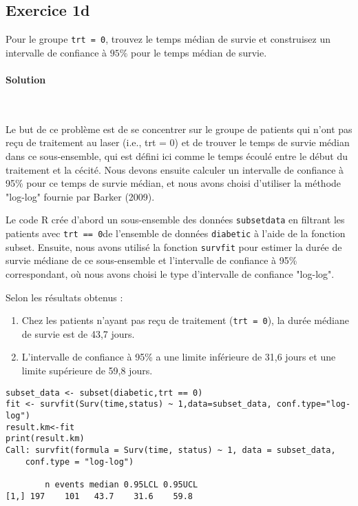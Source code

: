 \documentclass[../main.tex]{subfiles}
\begin{document}
\begin{CJK*}{UTF8}{gbsn}

\section*{Exercice 1d}
Pour le groupe \texttt{trt = 0}, trouvez le temps médian de survie et
construisez un intervalle de confiance à $95\%$ pour le temps médian de survie.
    
\paragraph{Solution}\
    
Le but de ce problème est de se concentrer sur le groupe de patients qui n'ont pas reçu de traitement au laser (i.e., trt = 0) et de trouver le temps de survie médian dans ce sous-ensemble, qui est défini ici comme le temps écoulé entre le début du traitement et la cécité. Nous devons ensuite calculer un intervalle de confiance à 95\% pour ce temps de survie médian, et nous avons choisi d'utiliser la méthode "log-log" fournie par Barker (2009).
    
Le code R crée d'abord un sous-ensemble des données \texttt{subsetdata} en filtrant les patients avec \texttt{trt == 0}de l'ensemble de données \texttt{diabetic} à l'aide de la fonction subset. Ensuite, nous avons utilisé la fonction \texttt{survfit} pour estimer la durée de survie médiane de ce sous-ensemble et l'intervalle de confiance à 95\% correspondant, où nous avons choisi le type d'intervalle de confiance "log-log".
    
Selon les résultats obtenus :
\begin{enumerate}
    \item Chez les patients n'ayant pas reçu de traitement (\texttt{trt = 0}), la durée médiane de survie est de 43,7 jours.
    \item L'intervalle de confiance à 95\% a une limite inférieure de 31,6 jours et une limite supérieure de 59,8 jours.
\end{enumerate}
    
\begin{lstlisting}
subset_data <- subset(diabetic,trt == 0)
fit <- survfit(Surv(time,status) ~ 1,data=subset_data, conf.type="log-log")
result.km<-fit
print(result.km)
Call: survfit(formula = Surv(time, status) ~ 1, data = subset_data, 
    conf.type = "log-log")
    
        n events median 0.95LCL 0.95UCL
[1,] 197    101   43.7    31.6    59.8
\end{lstlisting}

\end{CJK*}
\end{document}
